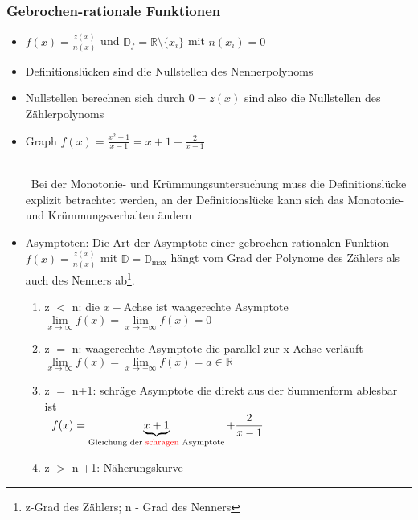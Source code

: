\documentclass[a4paper,twocolumn,10pt]{onepgnote1}
\renewcommand\mynote{\notebox{Hinweis:}\ }  %
\begin{document}
\subsubsection{Gebrochen-rationale Funktionen}
\begin{itemize}
\item $f(x) = \frac{z(x)}{n(x)}$ und $\mathds{D}_f = \mathds{R}\setminus\{x_i\}$ mit $n(x_i) = 0$
\item Definitionslücken sind die Nullstellen des Nennerpolynoms
\item Nullstellen berechnen sich durch  $0= z(x)$ sind also die Nullstellen des Zählerpolynoms
\item Graph $f(x) = \frac{x^2+1}{x-1} = x+1 +\frac{2}{x-1} $\\
 \\
\mynote Bei der Monotonie- und Krümmungsuntersuchung muss die Definitionslücke explizit betrachtet werden, an der Definitionslücke kann sich das Monotonie- und Krümmungsverhalten ändern
\item Asymptoten: Die Art der Asymptote einer gebrochen-rationalen Funktion $f(x)=\frac{z(x)}{n(x)}$ mit $\mathds{D} = \mathds{D}_{\text{max}}$ hängt vom Grad der Polynome des Zählers  als auch des Nenners ab\footnote{z-Grad des Zählers; n - Grad des Nenners}.\\
\begin{enumerate}\item z $<$ n: die $x-$Achse ist waagerechte Asymptote $\lim\limits_{x\longrightarrow \infty} f(x) = \lim\limits_{x\longrightarrow -\infty} f(x) = 0$\\
\item  z $=$ n: waagerechte Asymptote die parallel zur x-Achse verläuft $\lim\limits_{x\longrightarrow \infty} f(x) = \lim\limits_{x\longrightarrow -\infty} f(x) = a \in\mathds{R}$\\
\item z $=$ n+1: schräge Asymptote die direkt aus der Summenform ablesbar ist \\
\mynote $f(x) =\underbrace{x+1}_{\text{Gleichung der \textcolor{red}{schrägen} Asymptote}} +\dfrac{2}{x-1}$\\
\item z $>$ n +1: Näherungskurve
\end{enumerate}
 \end{itemize}
\end{document}
